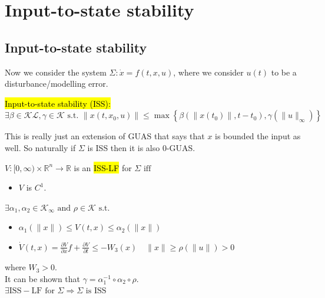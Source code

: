 \section{Input-to-state stability}
\subsection{Input-to-state stability}
Now we consider the system $\Sigma: \dot{x}=f(t, x, u)$, where we consider $u(t)$ to be a disturbance/modelling error.

\begin{definition}
    \hl{Input-to-state stability (ISS):} $\exists \beta \in \mathscr{K} \mathscr{L}, \gamma \in \mathscr{K} \text { s.t. } \left\|x\left(t, x_{0}, u\right)\right\| \leq \max \left\{\beta\left(\left\|x\left(t_{0}\right)\right\|, t-t_{0}\right), \gamma\left(\|u\|_{\infty}\right)\right\}$
\end{definition}
\begin{remark}
    This is really just an extension of GUAS that says that $x$ is bounded the input as well. So naturally if $\Sigma$ is ISS then it is also 0-GUAS.
\end{remark}

\begin{tcolorbox}[colback=white, colframe=teal]
\begin{definition}
    $V:[0, \infty) \times \mathbb{R}^{n} \rightarrow \mathbb{R}$ is an \hl{ISS-LF} for $\Sigma \text { iff }$
    \begin{itemize}[topsep=0pt]
        \item $V$ is $C^1$.
    \end{itemize}
    $\exists \alpha_{1}, \alpha_{2} \in \mathscr{K}_{\infty} \text { and } \rho \in \mathscr{K} \text { s.t. }$
    \begin{itemize}[topsep=0pt]
        \item $\alpha_{1}(\|x\|) \leq V(t, x) \leq \alpha_{2}(\|x\|)$
        \item $\dot{V}(t, x)=\frac{\partial V}{\partial x} f+\frac{\partial V}{\partial t} \leq-W_{3}(x) \quad\|x\| \geq \rho(\|u\|)>0$
    \end{itemize}
    where $W_3 > 0$.\\
    It can be shown that $\gamma=\alpha_{1}^{-1} \circ \alpha_{2} \circ \rho$.\\
    $\exists \mathrm{ISS}-\mathrm{LF} \text { for } \Sigma \Rightarrow \Sigma \text { is } \mathrm{ISS}$
\end{definition}
\end{tcolorbox}

